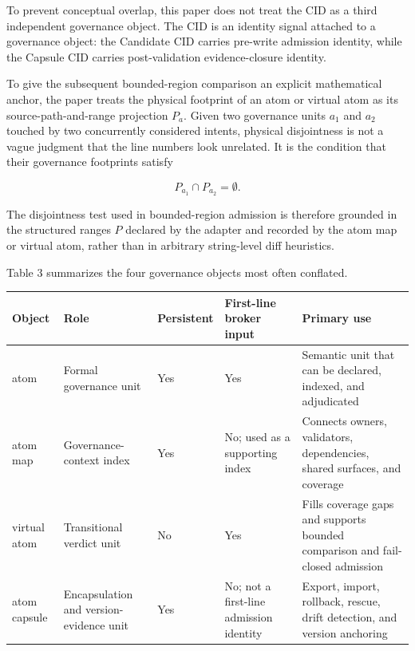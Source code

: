 \documentclass[9pt,letterpaper]{extarticle}
\newcommand{\TableFont}{\fontsize{8.2}{9.4}\selectfont}
\newcommand{\TableLead}[1]{\par\smallskip\noindent{\raggedright\small\bfseries #1\par}\smallskip}
\begin{document}
To prevent conceptual overlap, this paper does not treat the CID as a third independent governance object. The CID is an identity signal attached to a governance object: the Candidate CID carries pre-write admission identity, while the Capsule CID carries post-validation evidence-closure identity.

To give the subsequent bounded-region comparison an explicit mathematical anchor, the paper treats the physical footprint of an atom or virtual atom as its source-path-and-range projection $P_a$. Given two governance units $a_1$ and $a_2$ touched by two concurrently considered intents, physical disjointness is not a vague judgment that {}the line numbers look unrelated.{} It is the condition that their governance footprints satisfy

\[
P_{a_1} \cap P_{a_2} = \emptyset.
\]

The disjointness test used in bounded-region admission is therefore grounded in the structured ranges $P$ declared by the adapter and recorded by the atom map or virtual atom, rather than in arbitrary string-level diff heuristics.

Table 3 summarizes the four governance objects most often conflated.

\TableLead{Table 3 --- Governance Object Comparison.}

\begingroup
\TableFont
\setlength{\tabcolsep}{2pt}
\begin{longtable}{@{}L{0.17\textwidth}L{0.17\textwidth}L{0.18\textwidth}L{0.18\textwidth}L{0.18\textwidth}@{}}
\toprule
Object & Role & Persistent & First-line broker input & Primary use \\
\midrule
atom & Formal governance unit & Yes & Yes & Semantic unit that can be declared, indexed, and adjudicated \\
atom map & Governance-context index & Yes & No; used as a supporting index & Connects owners, validators, dependencies, shared surfaces, and coverage \\
virtual atom & Transitional verdict unit & No & Yes & Fills coverage gaps and supports bounded comparison and fail-closed admission \\
atom capsule & Encapsulation and version-evidence unit & Yes & No; not a first-line admission identity & Export, import, rollback, rescue, drift detection, and version anchoring \\
\bottomrule
\end{longtable}
\endgroup
\end{document}
